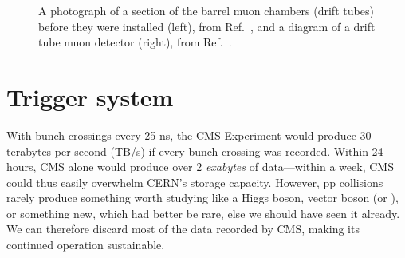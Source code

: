 \begin{figure}[htb]
    \centering
    \quad
    \caption{
        A photograph of a section of the barrel muon chambers (drift tubes) before they were installed (left), from Ref.~\cite{Hoch:1274451}, and a diagram of a drift tube muon detector (right), from Ref.~\cite{CMSWebMuonDT}. 
    }
    \label{fig:cms_muon_DT}
\end{figure}

\section{Trigger system}
With bunch crossings every 25 ns, the CMS Experiment would produce 30 terabytes per second (TB/s) if every bunch crossing was recorded. 
Within 24 hours, CMS alone would produce over 2 \textit{exabytes} of data---within a week, CMS could thus easily overwhelm CERN's storage capacity. 
However, pp collisions rarely produce something worth studying like a Higgs boson, vector boson (\PW or \PZ), or something new, which had better be rare, else we should have seen it already. 
We can therefore discard most of the data recorded by CMS, making its continued operation sustainable. 


